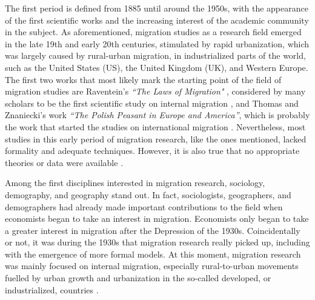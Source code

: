 The first period is defined from 1885 until around the 1950s, with the appearance of the first scientific works and the increasing interest of the academic community in the subject. As aforementioned, migration studies as a research field emerged in the late 19th and early 20th centuries, stimulated by rapid urbanization, which was largely caused by rural-urban migration, in industrialized parts of the world, such as the United States (US), the United Kingdom (UK), and Western Europe. The first two works that most likely mark the starting point of the field of migration studies are Raventein's \textit{``The Laws of Migration"} \citep{ravenstein_laws_1885, ravenstein_laws_1889}, considered by many scholars to be the first scientific study on internal migration \citep{scholten_introduction_2022, king_theories_2012, greenwood_early_2003, cohen_introduction_1996}, and Thomas and Znaniecki's work \textit{``The Polish Peasant in Europe and America''}, which is probably the work that started the studies on international migration  \citep{thomas_polish_1927, scholten_introduction_2022}. Nevertheless, most studies in this early period of migration research, like the ones mentioned, lacked formality and adequate techniques. However, it is also true that no appropriate theories or data were available \citep{greenwood_research_1975}.

Among the first disciplines interested in migration research, sociology, demography, and geography stand out. In fact, sociologists, geographers, and demographers had already made important contributions to the field when economists began to take an interest in migration. Economists only began to take a greater interest in migration after the Depression of the 1930s. Coincidentally or not, it was during the 1930s that migration research really picked up, including with the emergence of more formal models. At this moment, migration research was mainly focused on internal migration, especially rural-to-urban movements fuelled by urban growth and urbanization in the so-called developed, or industrialized, countries \citep{greenwood_early_2003}.

